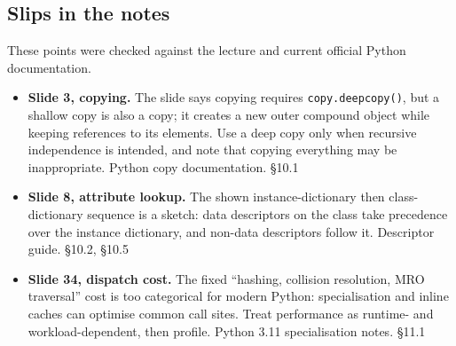 \documentclass[11pt]{article}
\begin{document}
\begin{keepsection}
\begin{keepsection}
\end{keepsection}
\end{keepsection}

\begin{keepsection}
\section{Slips in the notes}

These points were checked against the lecture and current official Python documentation.

\begin{itemize}
\item \textbf{Slide 3, copying.} The slide says copying requires \texttt{copy.deepcopy()}, but a shallow copy is also a copy; it creates a new outer compound object while keeping references to its elements. Use a deep copy only when recursive independence is intended, and note that copying everything may be inappropriate. Python copy documentation. \hfill{\small\color{FAUblue}§10.1}
\item \textbf{Slide 8, attribute lookup.} The shown instance-dictionary then class-dictionary sequence is a sketch: data descriptors on the class take precedence over the instance dictionary, and non-data descriptors follow it. Descriptor guide. \hfill{\small\color{FAUblue}§10.2, §10.5}
\item \textbf{Slide 34, dispatch cost.} The fixed “hashing, collision resolution, MRO traversal” cost is too categorical for modern Python: specialisation and inline caches can optimise common call sites. Treat performance as runtime- and workload-dependent, then profile. Python 3.11 specialisation notes. \hfill{\small\color{FAUblue}§11.1}
\end{itemize}
\end{keepsection}
\end{document}
